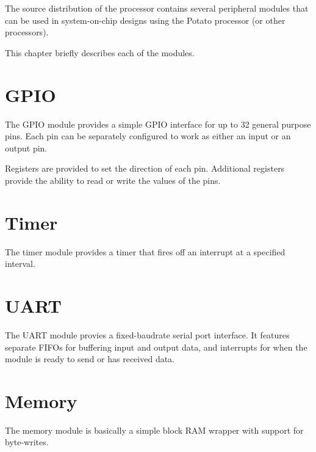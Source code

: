 \documentclass[12pt,a4paper]{report}
\begin{document}
The source distribution of the processor contains several peripheral modules that can be
used in system-on-chip designs using the Potato processor (or other processors).

This chapter briefly describes each of the modules.

\section{GPIO}

The GPIO module provides a simple GPIO interface for up to 32 general purpose pins.
Each pin can be separately configured to work as either an input or an output pin.

Registers are provided to set the direction of each pin. Additional registers
provide the ability to read or write the values of the pins.

\section{Timer}

The timer module provides a timer that fires off an interrupt at a specified
interval.

\section{UART}

The UART module provies a fixed-baudrate serial port interface. It features
separate FIFOs for buffering input and output data, and interrupts for when
the module is ready to send or has received data.

\section{Memory}

The memory module is basically a simple block RAM wrapper with support for
byte-writes.
\end{document}

